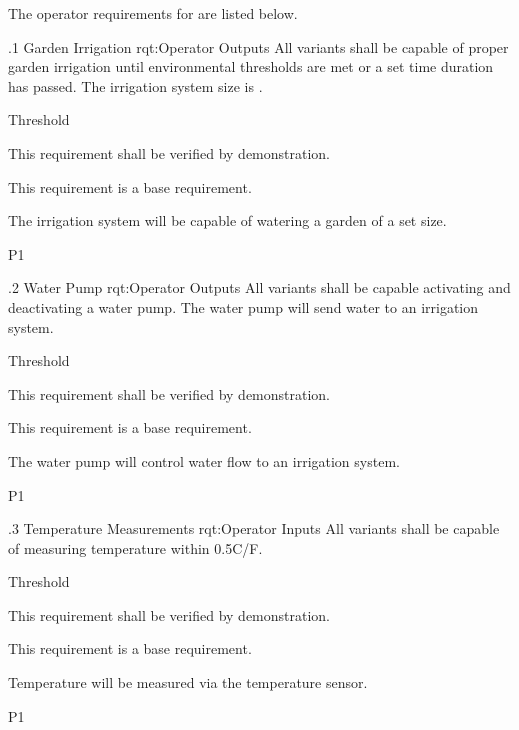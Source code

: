 The operator requirements for \ThisSystem are listed below.

\ONERQMTVKPP
{\RqtNumberBase.1}
{Garden Irrigation}
{rqt:Operator Outputs}
{All \ThisSys variants shall be capable of proper garden irrigation until environmental thresholds are met or a set time duration has passed. The irrigation system size is \TBD.}
{
	\item [All Phases] Threshold
}
{This requirement shall be verified by demonstration.}
{
	\item [N/A] This requirement is a base requirement.
}
{
  \item The irrigation system will be capable of watering a garden of a set size.
}
{P1}

\ONERQMTVKPP
{\RqtNumberBase.2}
{Water Pump}
{rqt:Operator Outputs}
{All \ThisSys variants shall be capable activating and deactivating a water pump. The water pump will send water to an irrigation system.}
{
	\item [All Phases] Threshold
}
{This requirement shall be verified by demonstration.}
{
	\item [N/A] This requirement is a base requirement.
}
{
  \item The water pump will control water flow to an irrigation system.
}
{P1}

\ONERQMTVKPP
{\RqtNumberBase.3}
{Temperature Measurements}
{rqt:Operator Inputs}
{All \ThisSys variants shall be capable of measuring temperature within 0.5\degree C/F.}
{
	\item [All Phases] Threshold
}
{This requirement shall be verified by demonstration.}
{
	\item [N/A] This requirement is a base requirement.
}
{
  \item Temperature will be measured via the \ThisSys temperature sensor.
}
{P1}

